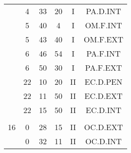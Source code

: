 \documentclass[12pt, a4paper]{article}
\begin{document}
\begin{multicols}{3}
{\begin{tabular}{c c c c c c}
	 	 	 	 & 4 & 33 & 20 & I & PA.D.INT\\%
	 	 	 	 & 5 & 40 & 4 & I & OM.F.INT\\%
	 	 	 	 & 5 & 43 & 40 & I & OM.F.EXT\\%
	 	 	 	 & 6 & 46 & 54 & I & PA.F.INT\\%
	 	 	 	 & 6 & 50 & 30 & I & PA.F.EXT\\%
	 	 	 	 & 22 & 10 & 20 & II & EC.D.PEN\\%
	 	 	 	 & 22 & 11 & 50 & II & EC.D.EXT\\%
	 	 	 	 & 22 & 15 & 50 & II & EC.D.INT\\%
	 	 	 	 & & & & & \\%
	 	 	 	16 & 0 & 28 & 15 & II & OC.D.EXT\\%
	 	 	 	 & 0 & 32 & 11 & II & OC.D.INT\\%
	 	 \end{tabular}
 	}
\end{multicols}
\end{document}
